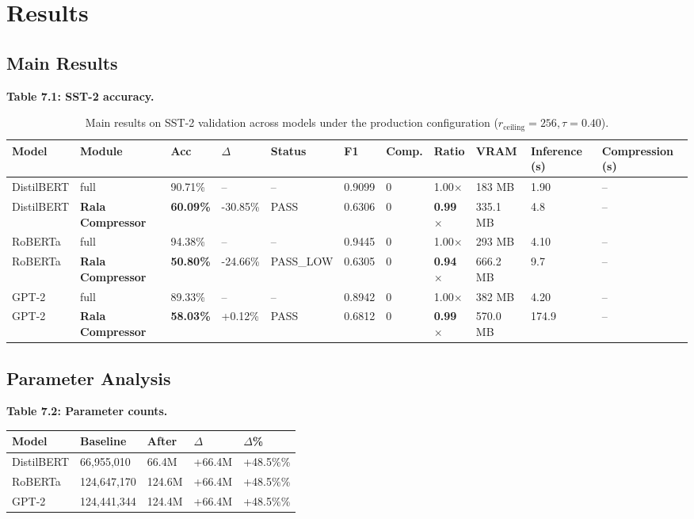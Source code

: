 
\section{Results}

\subsection{Main Results}

\textbf{Table 7.1: SST-2 accuracy.}

\begin{table}[t]
\centering
\small
\begin{tabular}{lllllllllll}
\toprule
\textbf{Model} & \textbf{Module} & \textbf{Acc} & \textbf{$\Delta$} & \textbf{Status} & \textbf{F1} & \textbf{Comp.} & \textbf{Ratio} & \textbf{VRAM} & \textbf{Inference (s)} & \textbf{Compression (s)} \\
\midrule
DistilBERT & full & 90.71\% & -- & -- & 0.9099 & 0 & 1.00$\times$ & 183 MB & 1.90 & -- \\
DistilBERT & \textbf{Rala Compressor} & \textbf{60.09\%} & -30.85\% & PASS & 0.6306 & 0 & \textbf{0.99$\times$} & 335.1 MB & 4.8 & -- \\
RoBERTa & full & 94.38\% & -- & -- & 0.9445 & 0 & 1.00$\times$ & 293 MB & 4.10 & -- \\
RoBERTa & \textbf{Rala Compressor} & \textbf{50.80\%} & -24.66\% & PASS\_LOW & 0.6305 & 0 & \textbf{0.94$\times$} & 666.2 MB & 9.7 & -- \\
GPT-2 & full & 89.33\% & -- & -- & 0.8942 & 0 & 1.00$\times$ & 382 MB & 4.20 & -- \\
GPT-2 & \textbf{Rala Compressor} & \textbf{58.03\%} & +0.12\% & PASS & 0.6812 & 0 & \textbf{0.99$\times$} & 570.0 MB & 174.9 & -- \\
\bottomrule
\end{tabular}
\caption{Main results on SST-2 validation across models under the production configuration ($r_{\mathrm{ceiling}}=256, \tau=0.40$).}
\label{tab:main_sst2}
\end{table}

\subsection{Parameter Analysis}

\textbf{Table 7.2: Parameter counts.}

\begin{table}[H]
\centering
\small
\begin{tabular}{lllll}
\toprule
\textbf{Model} & \textbf{Baseline} & \textbf{After} & \textbf{$\Delta$} & \textbf{$\Delta$\%} \\
\midrule
DistilBERT & 66,955,010 & 66.4M & +66.4M & +48.5\%\% \\
RoBERTa & 124,647,170 & 124.6M & +66.4M & +48.5\%\% \\
GPT-2 & 124,441,344 & 124.4M & +66.4M & +48.5\%\% \\
\bottomrule
\end{tabular}
\end{table}

